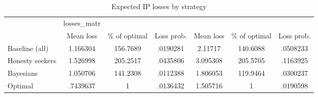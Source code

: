 \begin{table}[htbp]\centering
\caption{Expected IP losses by strategy}
\begin{tabular}{l*{6}{c}}
\hline\hline
            & losses\_matr&            &            &            &            &            \\
            &   Mean loss&\% of optimal&  Loss prob.&   Mean loss&\% of optimal&  Loss prob.\\
\hline
Baseline (all)&    1.166304&    156.7689&    .0190281&     2.11717&    140.6088&    .0508233\\
Honesty seekers&    1.526998&    205.2517&    .0435806&    3.095308&    205.5705&    .1163925\\
Bayesians   &    1.050706&    141.2308&    .0112388&    1.806053&    119.9464&    .0300237\\
Optimal     &    .7439637&           1&    .0136432&    1.505716&           1&    .0190598\\
\hline\hline
\end{tabular}
\end{table}
